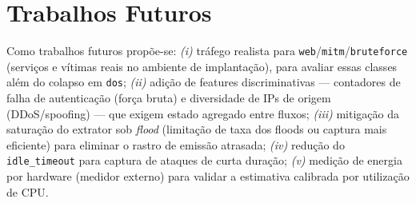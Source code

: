 \documentclass[12pt]{article}
\begin{document}
\section{Trabalhos Futuros}

Como trabalhos futuros propõe-se: \textit{(i)} tráfego realista para
\texttt{web}/\texttt{mitm}/\texttt{bruteforce} (serviços e vítimas reais no
ambiente de implantação), para avaliar essas classes além do colapso em
\texttt{dos}; \textit{(ii)} adição de features discriminativas — contadores de
falha de autenticação (força bruta) e diversidade de IPs de origem
(DDoS/spoofing) — que exigem estado agregado entre fluxos; \textit{(iii)}
mitigação da saturação do extrator sob \textit{flood} (limitação de taxa dos
floods ou captura mais eficiente) para eliminar o rastro de emissão atrasada;
\textit{(iv)} redução do \texttt{idle\_timeout} para captura de ataques de curta
duração; \textit{(v)} medição de energia por hardware (medidor externo) para
validar a estimativa calibrada por utilização de CPU.
\end{document}
